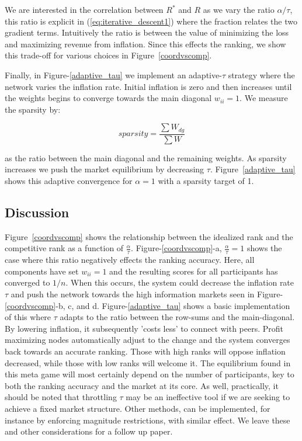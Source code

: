 \documentclass{article}
\begin{document}
We are interested in the correlation between $R^*$ and $R$ as we vary the ratio $\alpha/\tau$, this ratio is explicit in (\ref{eq:iterative_descent1}) where the fraction relates the two gradient terms. Intuitively the ratio is between the value of minimizing the loss and maximizing revenue from inflation. Since this effects the ranking, we show this trade-off for various choices in Figure~\ref{coordvscomp}. 

Finally, in Figure-\ref{adaptive_tau} we implement an adaptive-$\tau$ strategy where the network varies the inflation rate. Initial inflation is zero and then increases until the weights begins to converge towards the main diagonal $w_{ii}=1$. We measure the sparsity by: 

\begin{equation}
sparsity = \frac{\sum W_{dg}}{\sum W}
\end{equation}

as the ratio between the main diagonal and the remaining weights. As sparsity increases we push the market equilibrium by decreasing $\tau$. Figure~\ref{adaptive_tau} shows this adaptive convergence for $\alpha=1$ with a sparsity target of 1. 

\subsection{Discussion}

Figure~\ref{coordvscomp} shows the relationship between the idealized rank and the competitive rank as a function of $\frac{\alpha}{\tau}$. Figure-\ref{coordvscomp}-a, $\frac{\alpha}{\tau} = 1$ shows the case where this ratio negatively effects the ranking accuracy. Here, all components have set $w_{ii} = 1$ and the resulting scores for all participants has converged to $1/n$. When this occurs, the system could decrease the inflation rate $\tau$ and push the network towards the high information markets seen in Figure-\ref{coordvscomp}-b, c, and d. Figure-\ref{adaptive_tau} shows a basic implementation of this where $\tau$ adapts to the ratio between the row-sums and the main-diagonal. By lowering inflation, it subsequently 'costs less' to connect with peers. Profit maximizing nodes automatically adjust to the change and the system converges back towards an accurate ranking. Those with high ranks will oppose inflation decreased, while those with low ranks will welcome it. The equilibrium found in this meta game will most certainly depend on the number of participants, key to both the ranking accuracy and the market at its core. As well, practically, it should be noted that throttling $\tau$ may be an ineffective tool if we are seeking to achieve a fixed market structure. Other methods, can be implemented, for instance by enforcing magnitude restrictions, with similar effect. We leave these and other considerations for a follow up paper.
\end{document}
